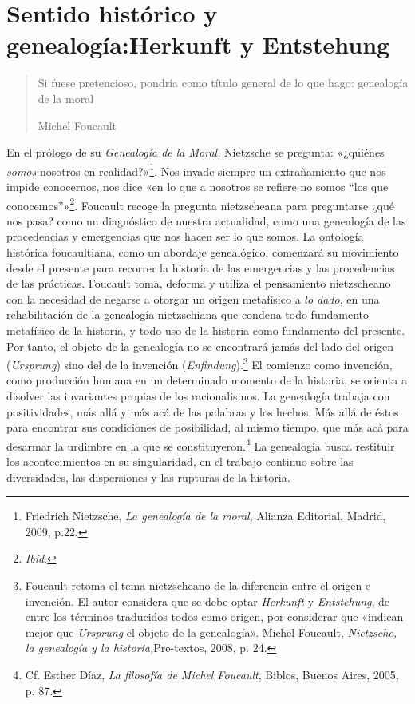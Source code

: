 \section{Sentido histórico y genealogía:Herkunft y Entstehung}

\begin{quote}
Si fuese pretencioso, pondría como título general de lo que hago: genealogía de la moral

Michel Foucault
\end{quote}

En el prólogo de su \emph{Genealogía de la Moral,} Nietzsche se pregunta: «¿quiénes \emph{somos} nosotros en realidad?»\footnote{Friedrich Nietzsche, \emph{La genealogía de la moral}, Alianza Editorial, Madrid, 2009, p.22.}. Nos invade siempre un extrañamiento que nos impide conocernos, nos dice «en lo que a nosotros se refiere no somos ``los que conocemos''»\footnote{\emph{Ibíd}.}. Foucault recoge la pregunta nietzscheana para preguntarse ¿qué nos pasa? como un diagnóstico de nuestra actualidad, como una genealogía de las procedencias y emergencias que nos hacen ser lo que somos. La ontología histórica foucaultiana, como un abordaje genealógico, comenzará su movimiento desde el presente para recorrer la historia de las emergencias y las procedencias de las prácticas. Foucault toma, deforma y utiliza el pensamiento nietzscheano con la necesidad de negarse a otorgar un origen metafísico a \emph{lo dado}, en una rehabilitación de la genealogía nietzschiana que condena todo fundamento metafísico de la historia, y todo uso de la historia como fundamento del presente. Por tanto, el objeto de la genealogía no se encontrará jamás del lado del origen (\emph{Ursprung}) sino del de la invención (\emph{Enfindung}).\footnote{Foucault retoma el tema nietzscheano de la diferencia entre el origen e invención. El autor considera que se debe optar \emph{Herkunft} y \emph{Entstehung}, de entre los términos traducidos todos como origen, por considerar que «indican mejor que \emph{Ursprung} el objeto de la genealogía». Michel Foucault, \emph{Nietzsche, la genealogía y la historia,}Pre-textos, 2008, p. 24.} El comienzo como invención, como producción humana en un determinado momento de la historia, se orienta a disolver las invariantes propias de los racionalismos. La genealogía trabaja con positividades, más allá y más acá de las palabras y los hechos. Más allá de éstos para encontrar sus condiciones de posibilidad, al mismo tiempo, que más acá para desarmar la urdimbre en la que se constituyeron.\footnote{Cf. Esther Díaz, \emph{La filosofía de Michel Foucault}, Biblos, Buenos Aires, 2005, p. 87.} La genealogía busca restituir los acontecimientos en su singularidad, en el trabajo continuo sobre las diversidades, las dispersiones y las rupturas de la historia.

